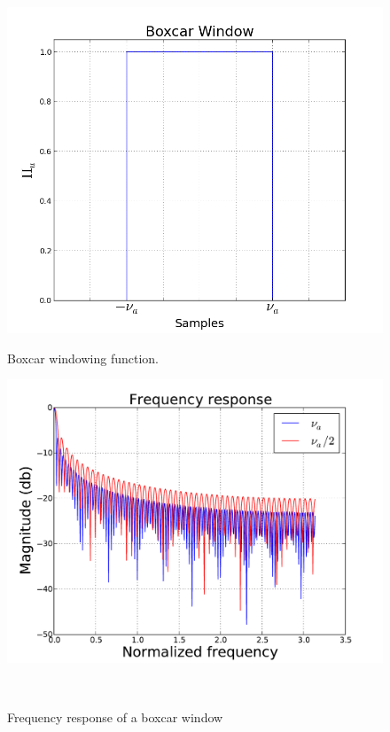 \documentclass[useAMS,usenatbib]{mn2e}
\begin{document}
\begin{figure}
  \centering
  \begin{minipage}{0.36\linewidth}\includegraphics[width=1\textwidth]{./Figures/rect.png}\caption{Boxcar windowing 
function.}\label{fig:fig_box}\end{minipage}
\hspace{1cm}
\begin{minipage}{0.36\linewidth}\includegraphics[width=1\textwidth]{./Figures/freq_resp_box.pdf}\caption{Frequency response of a boxcar 
window}\label{fig:fig_box_freq}\end{minipage}\\

\end{figure}
\end{document}
